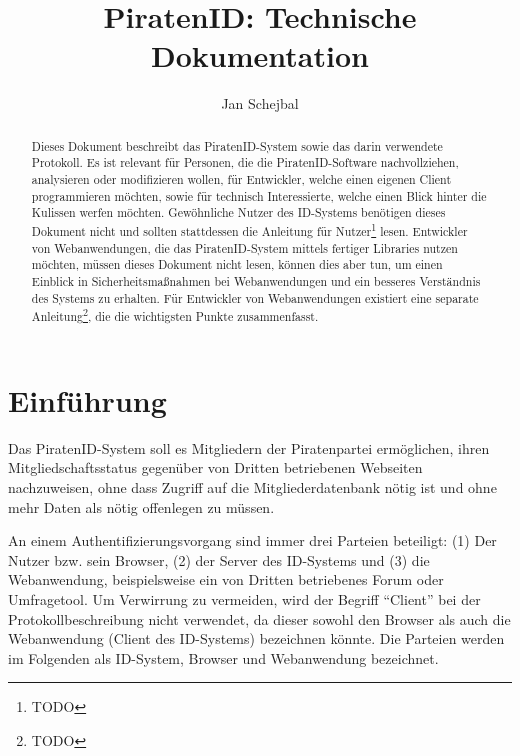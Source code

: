 \documentclass[parskip=half]{scrartcl}
\title{PiratenID: Technische Dokumentation}
\author{Jan Schejbal}
\date{}
\begin{document}
\maketitle

\begin{abstract}Dieses Dokument beschreibt das PiratenID-System sowie das darin verwendete Protokoll.
Es ist relevant für Personen, die die PiratenID-Software nachvollziehen, analysieren oder modifizieren wollen,
für Entwickler, welche einen eigenen Client programmieren möchten, sowie für technisch Interessierte, welche einen Blick hinter die Kulissen werfen möchten.
Gewöhnliche Nutzer des ID-Systems benötigen dieses Dokument nicht und sollten stattdessen die Anleitung für Nutzer\footnote{TODO} lesen.
Entwickler von Webanwendungen, die das PiratenID-System mittels fertiger Libraries nutzen möchten, müssen dieses Dokument nicht lesen,
können dies aber tun, um einen Einblick in Sicherheitsmaßnahmen bei Webanwendungen und ein besseres Verständnis des Systems zu erhalten.
Für Entwickler von Webanwendungen existiert eine separate Anleitung\footnote{TODO}, die die wichtigsten Punkte zusammenfasst.
\end{abstract}

\newpage

\tableofcontents

\newpage

\section{Einführung}
Das PiratenID-System soll es Mitgliedern der Piratenpartei ermöglichen, ihren Mitgliedschaftsstatus gegenüber von Dritten betriebenen Webseiten nachzuweisen,
ohne dass Zugriff auf die Mitgliederdatenbank nötig ist und ohne mehr Daten als nötig offenlegen zu müssen.

An einem Authentifizierungsvorgang sind immer drei Parteien beteiligt: (1) Der Nutzer bzw. sein Browser, (2) der Server des ID-Systems und (3) die Webanwendung,
beispielsweise ein von Dritten betriebenes Forum oder Umfragetool.
Um Verwirrung zu vermeiden, wird der Begriff "`Client"' bei der Protokollbeschreibung nicht verwendet,
da dieser sowohl den Browser als auch die Webanwendung (Client des ID-Systems) bezeichnen könnte.
Die Parteien werden im Folgenden als ID-System, Browser und Webanwendung bezeichnet.
\end{document}

